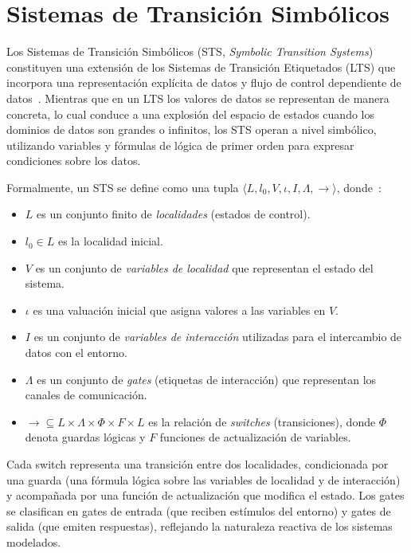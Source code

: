 \section{Sistemas de Transición Simbólicos}
\label{sec:sts}

Los Sistemas de Transición Simbólicos (STS, \textit{Symbolic Transition Systems}) constituyen una extensión de los Sistemas de Transición Etiquetados (LTS) que incorpora una representación explícita de datos y flujo de control dependiente de datos~\cite{frantzen2005sts}. Mientras que en un LTS los valores de datos se representan de manera concreta, lo cual conduce a una explosión del espacio de estados cuando los dominios de datos son grandes o infinitos, los STS operan a nivel simbólico, utilizando variables y fórmulas de lógica de primer orden para expresar condiciones sobre los datos.

Formalmente, un STS se define como una tupla $\langle L, l_0, V, \iota, I, \Lambda, \rightarrow \rangle$, donde~\cite{frantzen2006symbolic}:

\begin{itemize}
  \item $L$ es un conjunto finito de \textit{localidades} (estados de control).
  \item $l_0 \in L$ es la localidad inicial.
  \item $V$ es un conjunto de \textit{variables de localidad} que representan el estado del sistema.
  \item $\iota$ es una valuación inicial que asigna valores a las variables en $V$.
  \item $I$ es un conjunto de \textit{variables de interacción} utilizadas para el intercambio de datos con el entorno.
  \item $\Lambda$ es un conjunto de \textit{gates} (etiquetas de interacción) que representan los canales de comunicación.
  \item $\rightarrow \subseteq L \times \Lambda \times \Phi \times F \times L$ es la relación de \textit{switches} (transiciones), donde $\Phi$ denota guardas lógicas y $F$ funciones de actualización de variables.
\end{itemize}

Cada switch representa una transición entre dos localidades, condicionada por una guarda (una fórmula lógica sobre las variables de localidad y de interacción) y acompañada por una función de actualización que modifica el estado. Los gates se clasifican en gates de entrada (que reciben estímulos del entorno) y gates de salida (que emiten respuestas), reflejando la naturaleza reactiva de los sistemas modelados.

